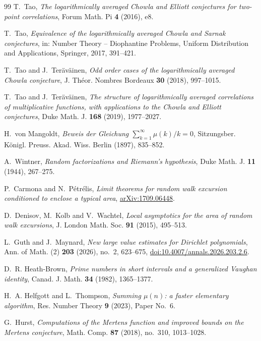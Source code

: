 \documentclass[11pt,reqno]{amsart}
\numberwithin{equation}{section}
\theoremstyle{plain}
\theoremstyle{definition}
\theoremstyle{remark}
\begin{document}
\begin{thebibliography}{99}
T.~Tao, \emph{The logarithmically averaged Chowla and Elliott conjectures for
two-point correlations}, Forum Math. Pi \textbf{4} (2016), e8.

T.~Tao, \emph{Equivalence of the logarithmically averaged Chowla and Sarnak
conjectures}, in: Number Theory -- Diophantine Problems, Uniform
Distribution and Applications, Springer, 2017, 391--421.

T.~Tao and J.~Ter\"av\"ainen, \emph{Odd order cases of the logarithmically
averaged Chowla conjecture}, J. Th\'eor. Nombres Bordeaux \textbf{30} (2018),
997--1015.

T.~Tao and J.~Ter\"av\"ainen, \emph{The structure of logarithmically averaged
correlations of multiplicative functions, with applications to the Chowla
and Elliott conjectures}, Duke Math. J. \textbf{168} (2019), 1977--2027.

H.~von Mangoldt, \emph{Beweis der Gleichung $\sum_{k=1}^\infty\mu(k)/k=0$},
Sitzungsber. K\"onigl. Preuss. Akad. Wiss. Berlin (1897), 835--852.

A.~Wintner, \emph{Random factorizations and Riemann's hypothesis}, Duke
Math. J. \textbf{11} (1944), 267--275.


P.~Carmona and N.~P\'etr\'elis, \emph{Limit theorems for random walk excursion
conditioned to enclose a typical area},
\href{https://arxiv.org/abs/1709.06448}{arXiv:1709.06448}.

D.~Denisov, M.~Kolb and V.~Wachtel, \emph{Local asymptotics for the area of
random walk excursions}, J. London Math. Soc. \textbf{91} (2015), 495--513.

L.~Guth and J.~Maynard, \emph{New large value estimates for Dirichlet
polynomials}, Ann. of Math. (2) \textbf{203} (2026), no.~2, 623--675,
\href{https://doi.org/10.4007/annals.2026.203.2.6}{doi:10.4007/annals.2026.203.2.6}.

D.~R. Heath-Brown, \emph{Prime numbers in short intervals and a generalized
Vaughan identity}, Canad. J. Math. \textbf{34} (1982), 1365--1377.

H.~A. Helfgott and L.~Thompson, \emph{Summing $\mu(n)$: a faster elementary
algorithm}, Res. Number Theory \textbf{9} (2023), Paper No.~6.

G.~Hurst, \emph{Computations of the Mertens function and improved bounds on
the Mertens conjecture}, Math. Comp. \textbf{87} (2018), no.~310, 1013--1028.


\end{thebibliography}
\end{document}
